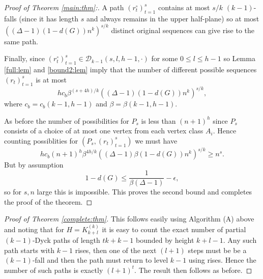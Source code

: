 \documentclass[12]{article}
\begin{document}
\begin{proof}[Proof of Theorem \ref{main:thm}:]
A path $(r_t^\circ)_{t=1}^s$ contains at most $s/k$ $(k-1)$-falls (since it has length $s$ and always remains in the upper half-plane) so at most $((\Delta-1)(1-d(G))n^k)^{s/k}$ distinct original sequences can give rise to the same path.



Finally, since  $(r_t^\circ)_{t=1}^s\in\mathcal{D}_{k-1}(s,l,h-1,\cdot)$ for some $0\leq l\leq h-1$ so Lemma \ref{full:lem} and \ref{bound2:lem} imply that the number of different possible sequences $(r_t)_{t=1}^s$ is at most
\[
 hc_b\beta^{(s+4h)/k}((\Delta-1)(1-d(G))n^k)^{s/k},\]
where $c_b=c_b(k-1,h-1)$ and $\beta=\beta(k-1,h-1)$.


As before the number of possibilities for $P_s$ is less than $(n+1)^h$ since $P_s$ consists of a choice of at most one vertex from each vertex class $A_i$.
Hence counting possiblities for  $(P_s,(r_t)_{t=1}^s)$ we must have
\[
 hc_b(n+1)^h\beta^{4h/k}((\Delta-1)\beta(1-d(G))n^k)^{s/k}\geq n^s.\]
 But by assumption \[
 1-d(G)\leq \frac{1}{\beta(\Delta-1)}-\epsilon,\] so for $s,n$ large this is impossible.  This proves the second bound and completes the proof of the theorem.
\end{proof}  
\begin{proof}[Proof of Theorem \ref{complete:thm}]
 This follows easily using Algorithm (A) above and noting that for $H=K_{k+l}^{(k)}$ it is easy to count the exact number of partial $(k-1)$-Dyck paths of length $tk+k-1$ bounded by height $k+l-1$. Any such path starts with $k-1$ rises, then one of the next $(l+1)$ steps must be be a $(k-1)$-fall and then the path must return to level $k-1$ using rises. Hence the number of such paths is exactly  $(l+1)^t$. The result then follows as before.
  \end{proof}


\end{document}
